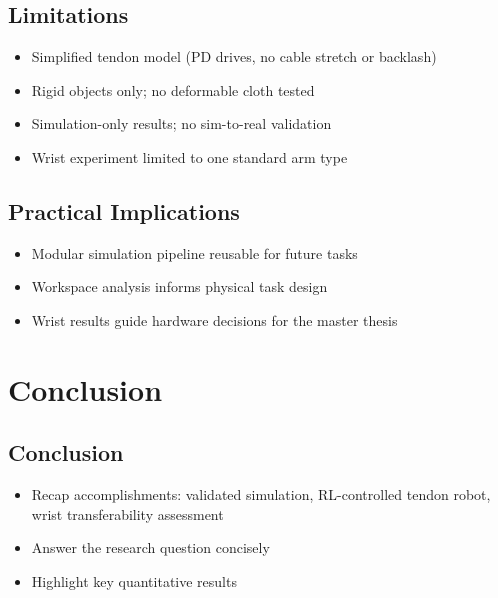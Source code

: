 \section{Limitations}
\begin{itemize}
    \item Simplified tendon model (PD drives, no cable stretch or backlash)
    \item Rigid objects only; no deformable cloth tested
    \item Simulation-only results; no sim-to-real validation
    \item Wrist experiment limited to one standard arm type
\end{itemize}

\section{Practical Implications}
\begin{itemize}
    \item Modular simulation pipeline reusable for future tasks
    \item Workspace analysis informs physical task design
    \item Wrist results guide hardware decisions for the master thesis
\end{itemize}

\chapter{Conclusion}\label{ch:conclusion}

\section{Conclusion}
\begin{itemize}
    \item Recap accomplishments: validated simulation, RL-controlled tendon robot, wrist transferability assessment
    \item Answer the research question concisely
    \item Highlight key quantitative results
\end{itemize}

